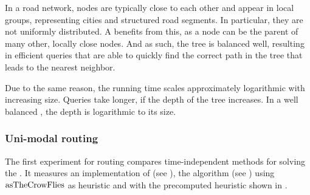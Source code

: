 	In a road network, nodes are typically close to each other and appear in local groups, representing cities and structured
	road segments. In particular, they are not uniformly distributed. A \coverTree benefits from this, as a node can be the
	parent of many other, locally close nodes. And as such, the tree is balanced well, resulting in efficient queries
	that are able to quickly find the correct path in the tree that leads to the nearest neighbor.
	
	Due to the same reason, the running time scales approximately logarithmic with increasing size. Queries take longer, if the
	depth of the tree increases. In a well balanced \coverTree, the depth is logarithmic to its size.

\subsubsection{Uni-modal routing}
	The first experiment for \uniModal routing compares time-independent methods for solving the \shortestPathProblem.
	It measures an implementation of \dijkstra (see ), the \astar algorithm (see )
	using $\operatorname{asTheCrowFlies}$ as heuristic and \alt with the precomputed heuristic shown in .
	
